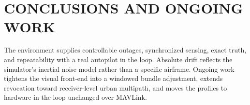 \documentclass{wscposterproc}
\begin{document}
\section{CONCLUSIONS AND ONGOING WORK}
\label{sec:concl}
The environment supplies controllable outages, synchronized sensing, exact truth, and
repeatability with a real autopilot in the loop.
Absolute drift reflects the simulator's inertial noise model rather than a specific
airframe.
Ongoing work tightens the visual front-end into a windowed bundle adjustment,
extends revocation toward receiver-level urban multipath, and moves the profiles to
hardware-in-the-loop unchanged over MAVLink.

\enlargethispage{30mm}
\vspace{-2mm}
{\fontsize{9}{10.5}\selectfont


}
\end{document}
